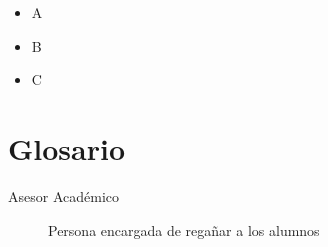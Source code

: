 \documentclass[12pt,letterpaper,spanish]{report}
\begin{document}
\begin{itemize}
  \item A
  \item B
  \item C
\end{itemize}





\newpage
\chapter{Glosario}

\begin{description}
  \item[Asesor Académico] Persona encargada de regañar a los alumnos
\end{description}

\end{document}
